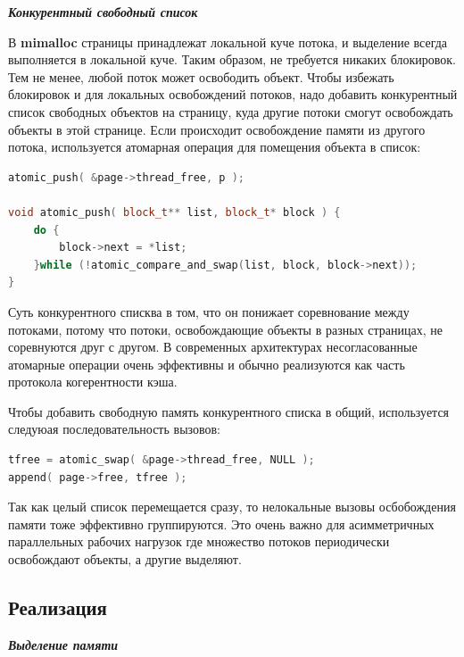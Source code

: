 \bigbreak
\textit{\textbf{Конкурентный свободный список}}

В \textbf{mimalloc} страницы принадлежат локальной куче потока, и выделение всегда выполняется в локальной куче. Таким образом, не требуется никаких блокировок. Тем не менее, любой поток может освободить объект. Чтобы избежать блокировок и для локальных освобождений потоков, надо добавить конкурентный список свободных объектов на страницу, куда другие потоки смогут освобождать объекты в этой странице. Если происходит освобождение памяти из другого потока, используется атомарная операция для помещения объекта в список:

\begin{lstlisting}[language=c++,numbers=none]
atomic_push( &page->thread_free, p );

void atomic_push( block_t** list, block_t* block ) {
	do {
		block->next = *list;
	}while (!atomic_compare_and_swap(list, block, block->next));
}
\end{lstlisting}

Суть конкурентного списква в том, что он понижает соревнование между потоками, потому что потоки, освобождающие объекты в разных страницах, не соревнуются друг с другом. В современных архитектурах несогласованные атомарные операции очень эффективны и обычно реализуются как часть протокола когерентности кэша.

Чтобы добавить свободную память конкурентного списка в общий, используется следуюая последовательность вызовов:
\begin{lstlisting}[language=c++,numbers=none]
tfree = atomic_swap( &page->thread_free, NULL );
append( page->free, tfree );
\end{lstlisting}

Так как целый список перемещается сразу, то нелокальные вызовы осбобождения памяти тоже эффективно группируются. Это очень важно для асимметричных параллельных рабочих нагрузок где множество потоков периодически освобождают объекты, а другие выделяют.

\subsection{Реализация}

\bigbreak
\textit{\textbf{Выделение памяти}}

